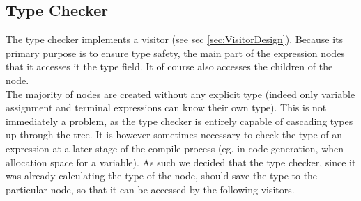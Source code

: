\subsection{Type Checker}
\label{sec:typeCheckerDesign}
The type checker implements a visitor (see sec \ref{sec:VisitorDesign}). 
Because its primary purpose is to ensure type safety, the main part of the expression nodes that it accesses it the type field. It of course also accesses the children of the node.\\
The majority of nodes are created without any explicit type (indeed only variable assignment and terminal expressions can know their own type). This is not immediately a problem, as the type checker is entirely capable of cascading types up through the tree. It is however sometimes necessary to check the type of an expression at a later stage of the compile process (eg. in code generation, when allocation space for a variable). As such we decided that the type checker, since it was already calculating the type of the node, should save the type to the particular node, so that it can be accessed by the following visitors.